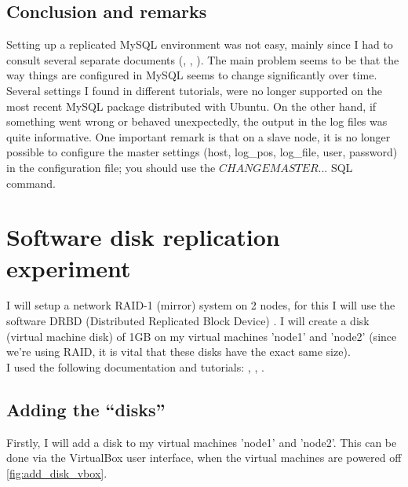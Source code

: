 \documentclass[12pt]{report}
\begin{document}
\subsection{Conclusion and remarks}
Setting up a replicated MySQL environment was not easy, mainly since I
had to consult several separate documents (\cite{mysql_official_replication_doc}, \cite{mysql_replication_howtoforge}, \cite{mysql_replication_stackexchange}). The main problem seems to
be that the way things are configured in MySQL seems to change significantly
over time. Several settings I found in different tutorials, were no
longer supported on the most recent MySQL package distributed with
Ubuntu.
On the other hand, if something went wrong or behaved unexpectedly,
the output in the log files was quite informative. 
One important remark is that on a slave node, it is no longer possible
to configure the master settings (host, log\_pos, log\_file, user,
password) in the configuration file; you should use the $CHANGE
MASTER ...$ SQL command.

\section{Software disk replication experiment}
I will setup a network RAID-1 (mirror)
system on 2 nodes, for this I will use the software DRBD 
(Distributed Replicated Block Device) \cite{drbd_soft:2013}.
I will create a disk (virtual machine disk) of 1GB on my virtual
machines 'node1' and 'node2' (since we're using RAID, it is vital that
these disks have the exact same size).\\

I used the following documentation and tutorials:
\cite{drbd_ubuntu_doc}, \cite{drbd_official_doc}, \cite{drbd_howtoforge}.

\subsection{Adding the ``disks''}
Firstly, I will add a disk to my virtual machines 'node1' and
'node2'. This can be done via the VirtualBox user interface, when the
virtual machines are powered off \ref{fig:add_disk_vbox}.
\end{document}
